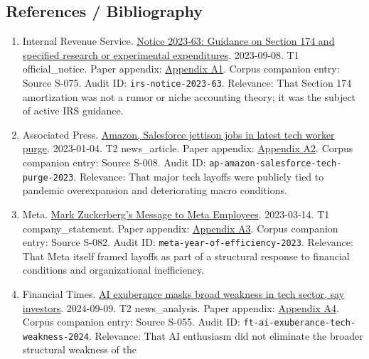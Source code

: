 \documentclass[
  american,
  11pt,
  letterpaper,
]{article}
\providecommand{\tightlist}{%
  \setlength{\itemsep}{0pt}\setlength{\parskip}{0pt}}
\begin{document}
\subsection{References / Bibliography}\label{references-bibliography}

\begin{enumerate}
\def\labelenumi{\arabic{enumi}.}
\tightlist
\item
  Internal Revenue Service.
  \href{https://www.irs.gov/pub/irs-drop/n-23-63.pdf}{Notice 2023-63:
  Guidance on Section 174 and specified research or experimental
  expenditures}. 2023-09-08. T1 official\_notice. Paper appendix:
  \hyperref[appendix-a1-notice-2023-63-guidance-on-section-174-and-specified-research-or-experimental-expenditures]{Appendix
  A1}. Corpus companion entry: Source S-075. Audit ID:
  \texttt{irs-notice-2023-63}. Relevance: That Section 174 amortization
  was not a rumor or niche accounting theory; it was the subject of
  active IRS guidance.
\item
  Associated Press.
  \href{https://apnews.com/article/bbb2f3a09eafdfc7cda54a3b87e538ad}{Amazon,
  Salesforce jettison jobs in latest tech worker purge}. 2023-01-04. T2
  news\_article. Paper appendix:
  \hyperref[appendix-a2-amazon-salesforce-jettison-jobs-in-latest-tech-worker-purge]{Appendix
  A2}. Corpus companion entry: Source S-008. Audit ID:
  \texttt{ap-amazon-salesforce-tech-purge-2023}. Relevance: That major
  tech layoffs were publicly tied to pandemic overexpansion and
  deteriorating macro conditions.
\item
  Meta.
  \href{https://about.fb.com/news/2023/03/mark-zuckerberg-meta-year-of-efficiency/}{Mark
  Zuckerberg's Message to Meta Employees}. 2023-03-14. T1
  company\_statement. Paper appendix:
  \hyperref[appendix-a3-mark-zuckerberg-s-message-to-meta-employees]{Appendix
  A3}. Corpus companion entry: Source S-082. Audit ID:
  \texttt{meta-year-of-efficiency-2023}. Relevance: That Meta itself
  framed layoffs as part of a structural response to financial
  conditions and organizational inefficiency.
\item
  Financial Times.
  \href{https://www.ft.com/content/0b14d871-2d19-46f1-9660-5466301e8066}{AI
  exuberance masks broad weakness in tech sector, say investors}.
  2024-09-09. T2 news\_analysis. Paper appendix:
  \hyperref[appendix-a4-ai-exuberance-masks-broad-weakness-in-tech-sector-say-investors]{Appendix
  A4}. Corpus companion entry: Source S-055. Audit ID:
  \texttt{ft-ai-exuberance-tech-weakness-2024}. Relevance: That AI
  enthusiasm did not eliminate the broader structural weakness of the

\end{enumerate}
\end{document}
